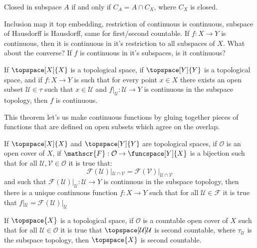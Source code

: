     \begin{theorem}
        Closed in subspace $A$ if and only if $C_{A}=A\cap{C}_{X}$, where
        $C_{X}$ is closed.
    \end{theorem}
    Inclusion map it top embedding, restriction of continuous is continuous,
    subspace of Hausdorff is Hausdorff, same for first/second countable.
    If $f:X\rightarrow{Y}$ is continuous, then it is continuous in it's
    restriction to all subspaces of $X$. What about the converse? If
    $f$ is continuous in it's subspaces, is it continuous?
    \begin{theorem}
        If $\topspace[X]{X}$ is a topological space, if $\topspace[Y]{Y}$ is
        a topological space, and if $f:X\rightarrow{Y}$ is such that for
        every point $x\in{X}$ there exists an open subset
        $\mathcal{U}\in\tau$ such that $x\in\mathcal{U}$ and
        $f|_{\mathcal{U}}:\mathcal{U}\rightarrow{Y}$ is continuous in the
        subspace topology, then $f$ is continuous.
    \end{theorem}
    This theorem let's us make continuous functions by gluing together
    pieces of functions that are defined on open subsets which agree on the
    overlap.
    \begin{theorem}
        If $\topspace[X]{X}$ and $\topspace[Y]{Y}$ are topological spaces,
        if $\mathcal{O}$ is an open cover of $X$, if
        $\mathscr{F}:\mathcal{O}\rightarrow\funcspace[Y]{X}$ is a bijection
        such that for all $\mathcal{U},\mathcal{V}\in\mathcal{O}$ it is true
        that:
        \begin{equation}
            \mathscr{F}(\mathcal{U})|_{\mathcal{U}\cap\mathcal{V}}=
            \mathscr{F}(\mathcal{V})|_{\mathcal{U}\cap\mathcal{V}}
        \end{equation}
        and such that
        $\mathscr{F}(\mathcal{U})|_{\mathcal{U}}:\mathcal{U}\rightarrow{Y}$
        is continuous in the subspace topology, then there is a unique
        continuous function $f:X\rightarrow{Y}$ such that for all
        $\mathcal{U}\in\mathscr{F}$ it is true that
        $f|_{\mathcal{U}}=\mathscr{F}(\mathcal{U})|_{\mathcal{U}}$
    \end{theorem}
    \begin{theorem}
        If $\topspace{X}$ is a topological space, if
        $\mathcal{O}$ is a countable open cover of $X$ such that for all
        $\mathcal{U}\in\mathcal{O}$ it is true that
        $\topspace[\mathcal{U}]{\mathcal{U}}$ is second countable, where
        $\tau_{\mathcal{U}}$ is the subspace topology, then $\topspace{X}$
        is second countable.
    \end{theorem}
